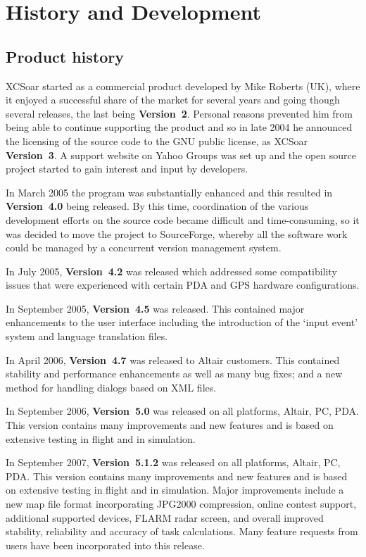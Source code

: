 \documentclass[a4paper,12pt]{refrep}
\begin{document}
\chapter{History and Development}\label{cha:history-development}
%
\section{Product history}
%
XCSoar started as a commercial product developed by Mike Roberts (UK),
where it enjoyed a successful share of the market for several years
and going though several releases, the last being {\bf Version~2}.
Personal reasons prevented him from being able to continue supporting
the product and so in late 2004 he announced the licensing of the
source code to the GNU public license, as XCSoar {\bf Version~3}.  A support
website on Yahoo Groups was set up and the open source project started
to gain interest and input by developers.

In March 2005 the program was substantially enhanced and this resulted 
in {\bf Version~4.0} being released.  By this time, coordination of
the various development efforts on the source code became difficult
and time-consuming, so it was decided to move the project to
SourceForge, whereby all the software work could be managed by a
concurrent version management system.

In July 2005, {\bf Version~4.2} was released which addressed some
compatibility issues that were experienced with certain PDA and GPS
hardware configurations.

In September 2005, {\bf Version~4.5} was released.  This contained
major enhancements to the user interface including the introduction
of the `input event' system and language translation files.

In April 2006, {\bf Version~4.7} was released to Altair customers.
This contained stability and performance enhancements as well as many
bug fixes; and a new method for handling dialogs based on XML files.

In September 2006, {\bf Version~5.0} was released on all platforms,
Altair, PC, PDA.  This version contains many improvements and new
features and is based on extensive testing in flight and in
simulation.

In September 2007, {\bf Version~5.1.2} was released on all platforms,
Altair, PC, PDA.  This version contains many improvements and new
features and is based on extensive testing in flight and in
simulation.  Major improvements include a new map file format
incorporating JPG2000 compression, online contest support, additional
supported devices, FLARM radar screen, and overall improved stability,
reliability and accuracy of task calculations.  Many feature requests
from users have been incorporated into this release.
\end{document}
